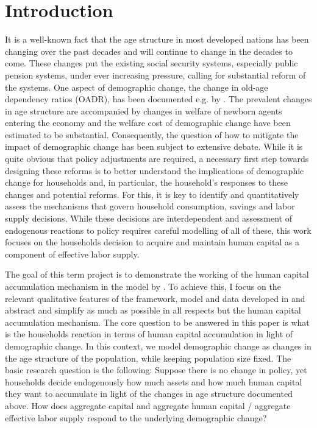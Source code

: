 \section{Introduction} %
\label{sec:introduction}

It is a well-known fact that the age structure in most developed nations has been changing over the past decades and will continue to change in the decades to come. These changes put the existing social security systems, especially public pension systems, under ever increasing pressure, calling for substantial reform of the systems. One aspect of demographic change, the change in old-age dependency ratios (OADR), has been documented e.g. by \cite{LudwigSchelkleVogel2012}. The prevalent changes in age structure are accompanied by changes in welfare of newborn agents entering the economy and the welfare cost of demographic change have been estimated to be substantial. Consequently, the question of how to mitigate the impact of demographic change has been subject to extensive debate. While it is quite obvious that policy adjustments are required, a necessary first step towards designing these reforms is to better understand the implications of demographic change for households and, in particular, the household's responses to these changes and potential reforms. For this, it is key to identify and quantitatively assess the mechanisms that govern household consumption, savings and labor supply decisions. While these decisions are interdependent and assessment of endogenous reactions to policy requires careful modelling of all of these, this work focuses on the households decision to acquire and maintain human capital as a component of effective labor supply.

The goal of this term project is to demonstrate the working of the human capital accumulation mechanism in the model by \cite{LudwigSchelkleVogel2012}. To achieve this, I focus on the relevant qualitative features of the framework, model and data developed in \cite{LudwigSchelkleVogel2012} and abstract and simplify as much as possible in all respects but the human capital accumulation mechanism. The core question to be answered in this paper is what is the households reaction in terms of human capital accumulation in light of demographic change. In this context, we model demographic change as changes in the age structure of the population, while keeping population size fixed. The basic research question is the following: Suppose there is no change in policy, yet households decide endogenously how much assets and how much human capital they want to accumulate in light of the changes in age structure documented above. How does aggregate capital and aggregate human capital / aggregate effective labor supply respond to the underlying demographic change?


